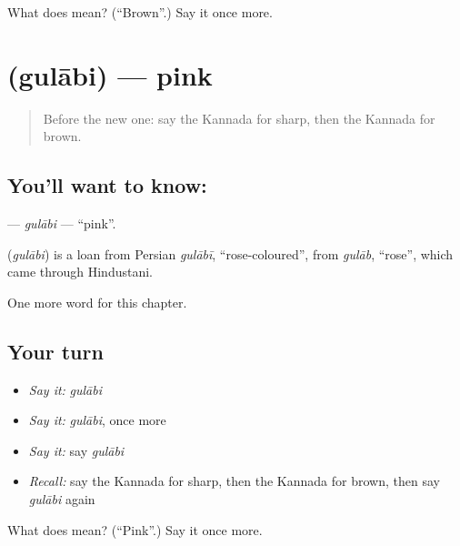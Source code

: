 \begin{tcolorbox}[breakable,colback=teal!4,colframe=teal!35!black,title={Before you move on}]
What does  mean? (\textquotedblleft{}Brown\textquotedblright{}.) Say it once more.
\end{tcolorbox}
\section[\texorpdfstring{\kn{ಗುಲಾಬಿ} (gulābi)}{ಗುಲಾಬಿ (gulābi)}]{ (gulābi) — pink}

\label{lesson:KA-C254-gulabi}



\begin{quote}
Before the new one: say the Kannada for sharp, then the Kannada for brown.
\end{quote}

\subsection*{You'll want to know: }
\textbf{} — \emph{gulābi} — \textquotedblleft{}pink\textquotedblright{}.

\begin{cousinweb}
\textbf{} (\emph{gulābi}) is a loan from Persian \emph{gulābī}, \textquotedblleft{}rose-coloured\textquotedblright{}, from \emph{gulāb}, \textquotedblleft{}rose\textquotedblright{}, which came through Hindustani.
\end{cousinweb}

\begin{grammarlens}[title={What you've built}]
One more word for this chapter.
\end{grammarlens}

\subsection*{Your turn}
\begin{itemize}
\raggedright
  \item \emph{Say it:} \emph{gulābi}
  \item \emph{Say it:} \emph{gulābi}, once more
  \item \emph{Say it:} say \emph{gulābi}
  \item \emph{Recall:} say the Kannada for sharp, then the Kannada for brown, then say \emph{gulābi} again
\end{itemize}

\begin{tcolorbox}[breakable,colback=teal!4,colframe=teal!35!black,title={Before you move on}]
What does  mean? (\textquotedblleft{}Pink\textquotedblright{}.) Say it once more.
\end{tcolorbox}
